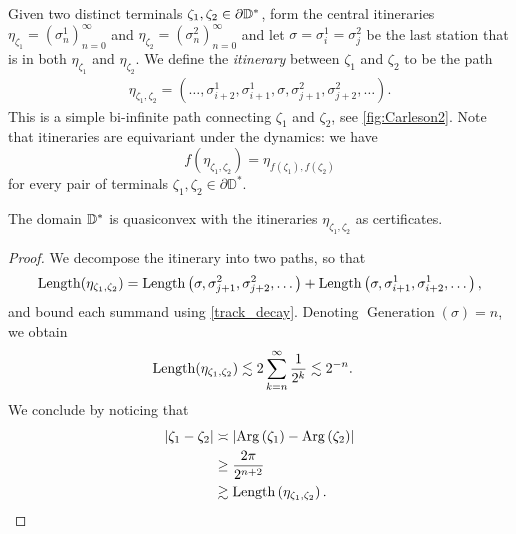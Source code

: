 \begin{definition} \label{def-disk-itinerary} Given two distinct terminals $\zeta_{1},\zeta_{2}\in\partial\mathbb{D}^*$, form the central itineraries $\eta_{\zeta_{1}}=\left(\sigma_{n}^{1}\right)_{n=0}^{\infty}$ and 
	$\eta_{\zeta_{2}}=\left(\sigma_{n}^{2}\right)_{n=0}^{\infty}$
	 and let  $\sigma=\sigma^1_i=\sigma^2_j$ be the last station that is in both $\eta_{\zeta_{1}}$ and $\eta_{\zeta_{2}}$. %
	 We define the \emph{itinerary} between  $\zeta_{1}$ and $\zeta_{2}$ to be the path  %
 \begin{gather*}
 \eta_{\zeta_{1},\zeta_{2}}=  \left(\dots,\sigma_{i+2}^{1},\sigma_{i+1}^{1},\sigma,\sigma_{j+1}^{2},\sigma_{j+2}^{2},\dots\right).
 \end{gather*}
	This is a simple bi-infinite path connecting $\zeta_{1}$ and $\zeta_{2}$, see \cref{fig:Carleson2}. Note that itineraries are equivariant under the dynamics: we have  \begin{equation}
		f(\eta_{\zeta_1,\zeta_2})=\eta_{f(\zeta_1),f(\zeta_2)}
	\end{equation} for every pair of terminals $\zeta_1,\zeta_2 \in \partial \mathbb D^*$.
	
	
\end{definition}


\begin{theorem} \label{quasiconvex disk}
The domain $\mathbb{D}^{*}$ is quasiconvex with the itineraries $\eta_{\zeta_1,\zeta_2}$ as certificates.
\end{theorem}

\begin{proof}
We decompose the itinerary into two paths, so that
\begin{equation}
\operatorname{Length}(\eta_{\zeta_{1},\zeta_{2}})=\operatorname{Length}\left(\sigma,\sigma_{j+1}^{2},\sigma_{j+2}^{2},\dots\right)
+\operatorname{Length}\left(\sigma,\sigma_{i+1}^{1},\sigma_{i+2}^{1},\dots\right),
\end{equation}
and bound each summand using \cref{track_decay}. Denoting $\operatorname{Generation}(\sigma)=n$, we obtain
\begin{align*}
\operatorname{Length}(\eta_{\zeta_{1},\zeta_{2}})
&\lesssim 2 \sum_{k=n}^{\infty}\frac{1}{2^{k}} 
\lesssim2^{-n}. \label{eq:1}
\end{align*}
We conclude by noticing that
\begin{align*}
\left|\zeta_{1}-\zeta_{2}\right|
&\asymp
\left|\operatorname{Arg}\left(\zeta_{1}\right)-\operatorname{Arg}\left(\zeta_{2}\right)\right|\\
&\geq \frac {2\pi}{2^{n+2}}\\
&\gtrsim 	\operatorname{Length}\left(\eta_{\zeta_{1},\zeta_{2}}\right).
\end{align*}
\end{proof}

